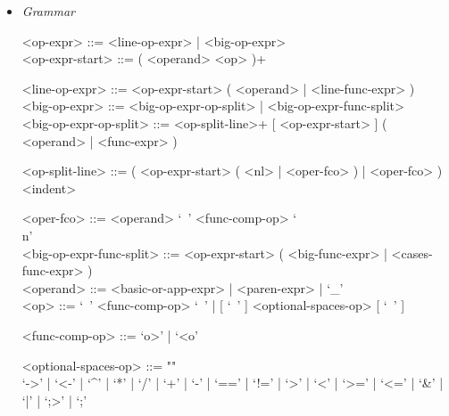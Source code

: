 \documentclass[diploma]{softlab-thesis}
\begin{document}
\begin{itemize}
\begin{verbatim}
"Hello, I'm a big string that's going to contain multiple values from " +
"inside the imaginary program that I'm a part of. Here they are:\n" +
"value1 = " + value1 + ", value2 = " + value2 + ", value3 = " + value3 +
", value4 = " + value4 + ", value5 = " + value5
\end{verbatim}

\textbf{Description}

It is possible to stretch a (big) operator expression over multiple lines.
In that case:
\begin{itemize}
\item
The operator expression must split in a new line after an operator (not an
operand).

\item
Every line after the first must be indented so that in begins at the column
where the first line of the operator expression begun.

\item
The precise indentation rules are described in the section
"Indentation System" \ref{subsubsec:indsys}.
\end{itemize}

\item \textit{Grammar}
\begin{grammar}
<op-expr> ::= <line-op-expr> | <big-op-expr>
\\

<op-expr-start> ::= ( <operand> <op> )+

<line-op-expr> ::= <op-expr-start> ( <operand> | <line-func-expr> )
\\

<big-op-expr> ::=
<big-op-expr-op-split> | <big-op-expr-func-split>
\\

<big-op-expr-op-split> ::=
<op-split-line>+ [ <op-expr-start> ] ( <operand> | <func-expr> )

<op-split-line> ::=
( <op-expr-start> ( <nl> | <oper-fco> ) | <oper-fco> ) <indent>

<oper-fco> ::= <operand> `\ ' <func-comp-op> `\\n'
\\

<big-op-expr-func-split> ::=
<op-expr-start> ( <big-func-expr> | <cases-func-expr> )
\\

<operand> ::= <basic-or-app-expr> | <paren-expr> | `_'
\\

<op> ::= `\ ' <func-comp-op> `\ ' | [ `\ ' ] <optional-spaces-op> [ `\ ' ]

<func-comp-op> ::= `o>' | `<o'

<optional-spaces-op> ::= ""\\
`->' | `<-' | `^' | `*' | `/' | `+' | `-' | `==' | `!=' | `>' | `<' | `>=' |
`<=' | `\&' | `|' | `;>' | `;'
\end{grammar}
\end{itemize}
\end{document}
